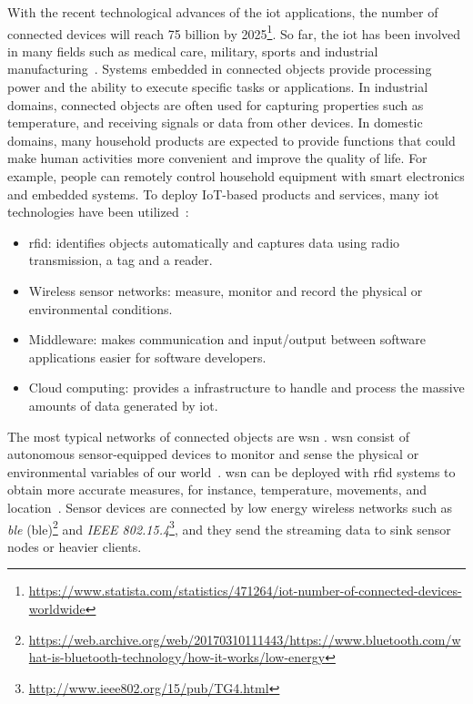 With the recent technological advances of the \acrfull{iot} applications, the
number of connected devices will reach 75 billion by
2025\footnote{\url{https://www.statista.com/statistics/471264/iot-number-of-connected-devices-worldwide}}.
So far, the \acrshort{iot} has been involved in many fields such as medical
care, military, sports and industrial
manufacturing~\cite{boudargham2017exhaustive, lai2013survey, da2014internet}.
Systems embedded in connected objects provide processing power and the ability
to execute specific tasks or applications. In industrial domains, connected
objects are often used for capturing properties such as temperature, and
receiving signals or data from other devices. In domestic domains, many
household products are expected to provide functions that could make human
activities more convenient and improve the quality of life. For example, people
can remotely control household equipment with smart electronics and embedded
systems. To deploy IoT-based products and services, many \acrshort{iot}
technologies have been utilized~\cite{lee2015internet}:
\begin{itemize}
    \item \acrfull{rfid}: identifies objects automatically
    and captures data using radio transmission, a tag and a reader.
    \item Wireless sensor networks: measure, monitor and record the physical
    or environmental conditions. 
    \item Middleware: makes communication and input/output between software applications easier for software
    developers.
    \item Cloud computing: provides a infrastructure to handle and process the massive
    amounts of data generated by \acrshort{iot}.
\end{itemize}

The most typical networks of connected objects are \acrfull{wsn} . \acrshort{wsn}
consist of autonomous sensor-equipped devices to monitor and sense the physical
or environmental variables of our world~\cite{lee2015internet, li2016temporal}.
\acrshort{wsn} can be deployed with \acrshort{rfid} systems to obtain more
accurate measures, for instance, temperature, movements, and
location~\cite{lee2015internet, atzori2010b}. Sensor devices are connected by
low energy wireless networks such as \emph{\acrlong{ble}}
(\acrshort{ble})\footnote{\url{https://web.archive.org/web/20170310111443/https://www.bluetooth.com/what-is-bluetooth-technology/how-it-works/low-energy}}
and \emph{IEEE 802.15.4}\footnote{\url{http://www.ieee802.org/15/pub/TG4.html}},
and they send the streaming data to sink sensor nodes or heavier clients.

